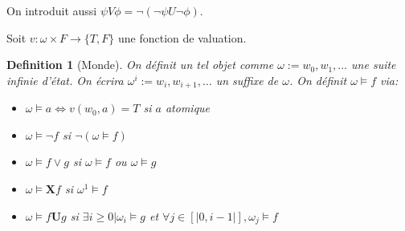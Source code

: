 \documentclass{paper}
\newtheorem{definition}{Definition}
\begin{document}
    On introduit aussi $\psi V \phi = \lnot(\lnot\psi U\lnot\phi)$.

    Soit $v : \omega\times F \rightarrow \{T,F\}$ une fonction de valuation.
    
    \begin{definition}[Monde]
        On définit un tel objet comme $\omega := w_0,w_1,\dots$ une suite infinie d'état.
        On écrira $\omega^i:=w_i,w_{i+1},\dots$ un suffixe de $\omega$.
        On définit $\omega \models f$ via:
        \begin{itemize}
            \item $\omega \models a \Leftrightarrow v(w_0,a) = T$ si $a$ atomique 
            \item $\omega \models \lnot f$ si $\lnot(\omega \models f)$ 
            \item $\omega \models f\lor g$ si $\omega \models f$ ou $\omega \models g$
            \item $\omega \models \textbf{X}f$ si $\omega^1 \models f$
            \item $\omega \models f\textbf{U}g$ si $\exists i \geq 0 | \omega_i \models g$ et $\forall j \in [|0, i-1|], \omega_j \models f$
        \end{itemize}
    \end{definition}
\end{document}
